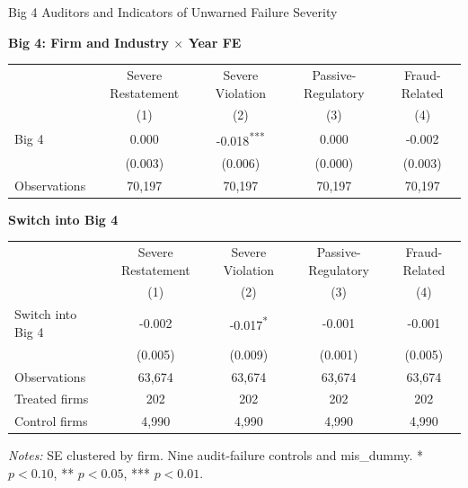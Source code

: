 \documentclass[10pt]{article}
\newcommand{\sym}[1]{\textsuperscript{#1}}
\begin{document}
\fontsize{10}{12}\selectfont
\setlength{\tabcolsep}{3pt}\renewcommand{\arraystretch}{1.15}
\begin{center}\large Big 4 Auditors and Indicators of Unwarned Failure Severity\end{center}
\medskip\textbf{Big 4: Firm and Industry $\times$ Year FE}\par\smallskip
\begin{tabular*}{\textwidth}{@{\extracolsep{\fill}}lcccc@{}}
\toprule
 & Severe Restatement & Severe Violation & Passive-Regulatory & Fraud-Related \\
 & (1) & (2) & (3) & (4) \\
\midrule
Big 4 & 0.000 & -0.018\sym{***} & 0.000 & -0.002 \\
 & (0.003) & (0.006) & (0.000) & (0.003) \\
Observations & 70,197 & 70,197 & 70,197 & 70,197 \\
\bottomrule\end{tabular*}\par
\medskip\textbf{Switch into Big 4}\par\smallskip
\begin{tabular*}{\textwidth}{@{\extracolsep{\fill}}lcccc@{}}
\toprule
 & Severe Restatement & Severe Violation & Passive-Regulatory & Fraud-Related \\
 & (1) & (2) & (3) & (4) \\
\midrule
Switch into Big 4 & -0.002 & -0.017\sym{*} & -0.001 & -0.001 \\
 & (0.005) & (0.009) & (0.001) & (0.005) \\
Observations & 63,674 & 63,674 & 63,674 & 63,674 \\
Treated firms & 202 & 202 & 202 & 202 \\
Control firms & 4,990 & 4,990 & 4,990 & 4,990 \\
\bottomrule\end{tabular*}\par
\medskip\fontsize{9}{11}\selectfont\textit{Notes:} SE clustered by firm. Nine audit-failure controls and mis\_dummy. * $p<0.10$, ** $p<0.05$, *** $p<0.01$.
\end{document}
